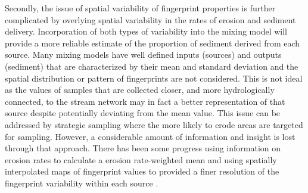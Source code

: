 \documentclass[
  number]{elsarticle}
\begin{document}
Secondly, the issue of spatial variability of fingerprint properties is
further complicated by overlying spatial variability in the rates of
erosion and sediment delivery. Incorporation of both types of
variability into the mixing model will provide a more reliable estimate
of the proportion of sediment derived from each source. Many mixing
models have well defined inputs (sources) and outputs (sediment) that
are characterized by their mean and standard deviation and the spatial
distribution or pattern of fingerprints are not considered. This is not
ideal as the values of samples that are collected closer, and more
hydrologically connected, to the stream network may in fact a better
representation of that source despite potentially deviating from the
mean value. This issue can be addressed by strategic sampling where the
more likely to erode areas are targeted for sampling. However, a
considerable amount of information and insight is lost through that
approach. There has been some progress using information on erosion
rates to calculate a erosion rate-weighted mean
\citep{wilkinson2015, du2017} and using spatially interpolated maps of
fingerprint values to provided a finer resolution of the fingerprint
variability within each source \citep{haddadchi2019}.
\end{document}
